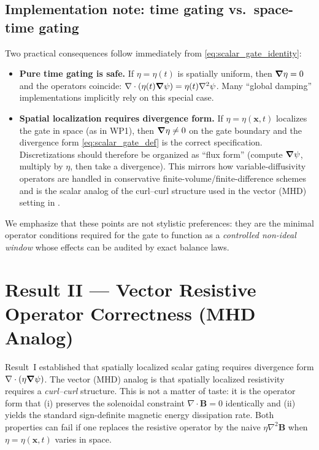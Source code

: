\documentclass[11pt]{article}
\theoremstyle{plain}
\theoremstyle{definition}
\theoremstyle{remark}
\newcommand{\diver}{\nabla\cdot}
\newcommand{\B}{\mathbf{B}}
\begin{document}
\subsection{Implementation note: time gating vs.\ space-time gating}\label{sec:result_scalar_impl}
Two practical consequences follow immediately from \eqref{eq:scalar_gate_identity}:

\begin{itemize}[leftmargin=*]
  \item \textbf{Pure time gating is safe.} If $\eta=\eta(t)$ is spatially uniform, then $\grad\eta=0$ and
  the operators coincide:
  $\diver(\eta(t)\grad\psi)=\eta(t)\nabla^2\psi$. Many ``global damping'' implementations implicitly rely
  on this special case.

  \item \textbf{Spatial localization requires divergence form.} If $\eta=\eta(\mathbf{x},t)$ localizes the
  gate in space (as in WP1), then $\grad\eta\neq 0$ on the gate boundary and the divergence form
  \eqref{eq:scalar_gate_def} is the correct specification. Discretizations should therefore be organized
  as ``flux form'' (compute $\grad\psi$, multiply by $\eta$, then take a divergence). This mirrors how
  variable-diffusivity operators are handled in conservative finite-volume/finite-difference schemes and
  is the scalar analog of the curl--curl structure used in the vector (MHD) setting in
  .
\end{itemize}

We emphasize that these points are not stylistic preferences: they are the minimal operator conditions
required for the gate to function as a \emph{controlled non-ideal window} whose effects can be audited by
exact balance laws.

\section{Result II --- Vector Resistive Operator Correctness (MHD Analog)}\label{sec:result_vector}

Result~I established that spatially localized scalar gating requires divergence form
$\diver(\eta\grad\psi)$. The vector (MHD) analog is that spatially localized resistivity requires a
\emph{curl--curl} structure. This is not a matter of taste: it is the operator form that (i) preserves
the solenoidal constraint $\diver\B=0$ identically and (ii) yields the standard sign-definite magnetic
energy dissipation rate. Both properties can fail if one replaces the resistive operator by the naive
$\eta\nabla^2\B$ when $\eta=\eta(\mathbf{x},t)$ varies in space.
\end{document}
